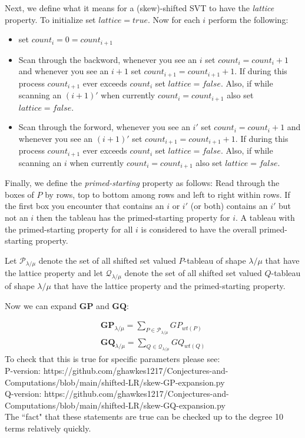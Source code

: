 \documentclass[]{amsart}
\theoremstyle{definition}
\begin{document}
Next, we define what it means for a (skew)-shifted SVT to have the \emph{lattice} property.  To initialize set $lattice=true$. Now for each $i$ perform the following:
\begin{itemize}
\item set $count_i=0=count_{i+1}$
\item Scan through the backword, whenever you see an $i$ set $count_i=count_i+1$ and whenever you see an $i+1$ set $count_{i+1}=count_{i+1}+1$.  If during this process $count_{i+1}$ ever exceeds $count_i$ set $lattice=false$. Also, if while scanning an $(i+1)'$ when currently $count_i=count_{i+1}$ also set $lattice=false$.
\item Scan through the forword, whenever you see an $i'$ set $count_i=count_i+1$ and whenever you see an $(i+1)'$ set $count_{i+1}=count_{i+1}+1$.  If during this process $count_{i+1}$ ever exceeds $count_i$ set $lattice=false$. Also, if while scanning an $i$ when currently $count_i=count_{i+1}$ also set $lattice=false$.
\end{itemize}



Finally, we define the \emph{primed-starting} property as follows: Read through the boxes of $P$ by rows, top to bottom among rows and left to right within rows.  If the first box you encounter that contains an $i$ or $i'$ (or both) contains an $i'$ but not an $i$ then the tableau has the primed-starting property for $i$. A tableau with the primed-starting property for all $i$ is considered to have the overall primed-starting property.  

Let $\mathcal{P}_{\lambda/\mu}$ denote the set of all shifted set valued $P$-tableau of shape $\lambda/\mu$ that have the lattice property and let $\mathcal{Q}_{\lambda/\mu}$ denote the set of all shifted set valued $Q$-tableau of shape $\lambda/\mu$ that have the lattice property and the primed-starting property.

Now we can expand $\mathbf{GP}$ and $\mathbf{GQ}$:

\begin{eqnarray*}
\mathbf{GP}_{\lambda/\mu}=\sum_{P \in \mathcal{P_{\lambda/\mu}}} GP_{wt(P)}\\
\mathbf{GQ}_{\lambda/\mu}=\sum_{Q \in \mathcal{Q_{\lambda/\mu}}} GQ_{wt(Q)}
\end{eqnarray*}
To check that this is true for specific parameters please see:\\
P-version: https://github.com/ghawkes1217/Conjectures-and-Computations/blob/main/shifted-LR/skew-GP-expansion.py\\
Q-version: https://github.com/ghawkes1217/Conjectures-and-Computations/blob/main/shifted-LR/skew-GQ-expansion.py\\
The ``fact" that these statements are true can be checked up to the degree 10 terms relatively quickly.   
\end{document}
